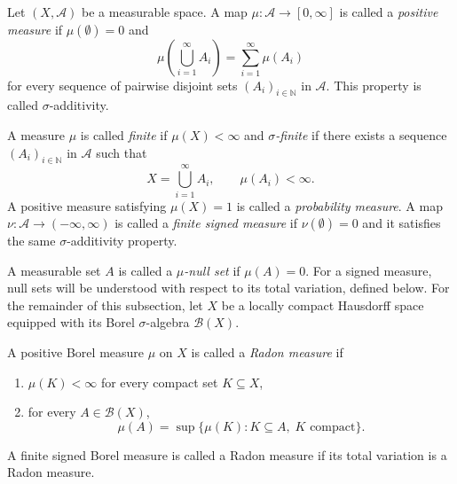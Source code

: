 \begin{definition}[Measures]
    Let $(X,\mathcal{A})$ be a measurable space.
    A map $\mu:\mathcal{A}\to[0,\infty]$ is called
    a \emph{positive measure} if
    $\mu(\emptyset)=0$ and
    \[
        \mu\left(\bigcup_{i=1}^{\infty}A_i\right)
        =\sum_{i=1}^{\infty}\mu(A_i)
    \]
    for every sequence of pairwise disjoint
    sets $(A_i)_{i\in\mathbb{N}}$ in $\mathcal{A}$.
    This property is called $\sigma$-additivity.

    A measure $\mu$ is called
    \emph{finite} if $\mu(X)<\infty$ and
    \emph{$\sigma$-finite} if there exists a
    sequence $(A_i)_{i\in\mathbb{N}}$ in
    $\mathcal{A}$ such that
    \[
        X=\bigcup_{i=1}^{\infty}A_i,
        \qquad \mu(A_i)<\infty.
    \]
    A positive measure satisfying $\mu(X)=1$
	is called a \emph{probability measure}. A map $\nu:\mathcal{A}\to(-\infty,\infty)$
    is called a \emph{finite signed measure}
    if $\nu(\emptyset)=0$ and it satisfies
    the same $\sigma$-additivity property.
\end{definition}

A measurable set $A$ is called a
\emph{$\mu$-null set} if $\mu(A)=0$.
For a signed measure, null sets will be
understood with respect to its total
variation, defined below. For the remainder of this subsection, let
$X$ be a locally compact Hausdorff space
equipped with its Borel $\sigma$-algebra
$\mathcal{B}(X)$.



\begin{definition}
    A positive Borel measure $\mu$ on $X$
    is called a \emph{Radon measure} if
    \begin{enumerate}
        \item $\mu(K)<\infty$ for every
              compact set $K\subseteq X$,
        \item for every $A\in\mathcal{B}(X)$,
              \[
                  \mu(A)
                  =\sup\{\mu(K):
                  K\subseteq A,\;
                  K\text{ compact}\}.
              \]
    \end{enumerate}
    A finite signed Borel measure is called
    a Radon measure if its total variation
    is a Radon measure.
\end{definition}


